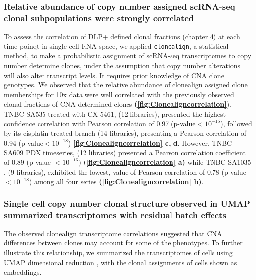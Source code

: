 \subsubsection{Relative abundance of copy number assigned scRNA-seq clonal subpopulations were strongly correlated}
 
 To assess the correlation of DLP+ defined clonal fractions (chapter 4) at each time poinqt in single cell RNA space, we applied \texttt{clonealign}, a statistical method, \cite{campbell2019clonealign} to make a probabilistic assignment of scRNA-seq transcriptomes to copy number determine clones, under the assumption that copy number alterations will also alter transcript levels. It requires prior knowledge of CNA clone genotypes.
 We observed that the relative abundance of clonealign assigned clone memberships for 10x data were well correlated with the previously observed clonal fractions of CNA determined clones \textbf{(\autoref{fig:Clonealigncorrelation}}). TNBC-SA535 treated with CX-5461, (12 libraries), presented the highest confidence correlation with Pearson correlation of 0.97 (p-value$< 10^{-15}$), followed by its cisplatin treated branch (14 libraries), presenting a Pearson correlation of 0.94 (p-value$< 10^{-18}$) \textbf{\autoref{fig:Clonealigncorrelation} c, d}. However, TNBC-SA609 PDX timeseries, (12 libraries) presented a Pearson correlation coefficient of 0.89 (p-value $< 10^{-16}$) \textbf{(\autoref{fig:Clonealigncorrelation} a)} while TNBC-SA1035 , (9 libraries), exhibited the lowest, value of Pearson correlation of 0.78 (p-value$< 10^{-18}$) among all four series \textbf{(\autoref{fig:Clonealigncorrelation} b)}.
  
  
\subsubsection{Single cell copy number clonal structure observed in UMAP summarized transcriptomes with residual batch effects}

The observed clonealign transcriptome correlations suggested that CNA differences between clones may account for some of the phenotypes. To further illustrate this relationship, we summarized the transcriptomes of cells using UMAP dimensional reduction \cite{becht2019dimensionality}, with the clonal assignments of cells shown as embeddings. 


